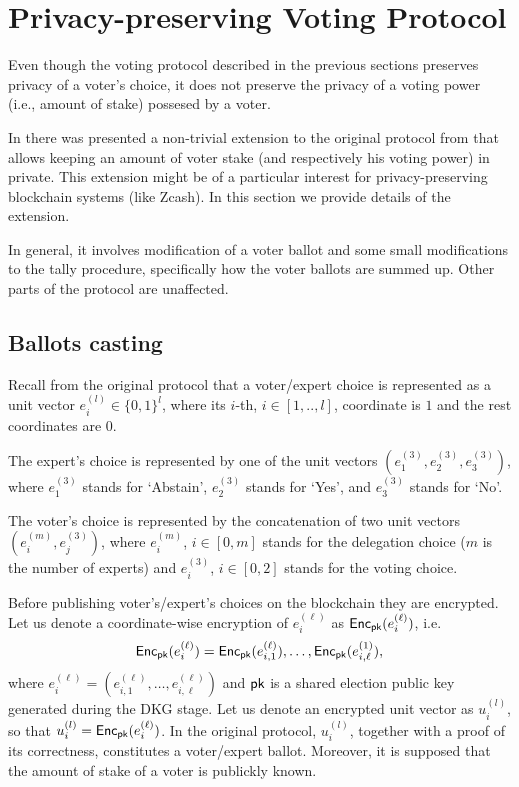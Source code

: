 \section{Privacy-preserving Voting Protocol}

Even though the voting protocol described in the previous sections preserves privacy of a voter's choice, it does not preserve the privacy of a voting power (i.e., amount of stake) possesed by a voter.

In \cite{ZBO20} there was presented a non-trivial extension to the original protocol from \cite{ZOB18} that allows keeping an amount of voter stake (and respectively his voting power) in private. This extension might be of a particular interest for privacy-preserving blockchain systems (like Zcash). In this section we provide details of the extension.

In general, it involves modification of a voter ballot and some small modifications to the tally procedure, specifically how the voter ballots are summed up. Other parts of the protocol are unaffected.

\subsection{Ballots casting}

Recall from the original protocol that a voter/expert choice is represented as a unit vector $e^{(l)}_i \in \{0,1\}^{l}$, where its $i$-th, $i \in [1,..,l]$, coordinate is $1$ and the rest coordinates are $0$.

The expert's choice  is represented by one of the unit vectors $(e^{(3)}_1, e^{(3)}_2, e^{(3)}_3)$, where $e^{(3)}_1$ stands for `Abstain', $e^{(3)}_2$ stands for `Yes', and $e^{(3)}_3$ stands for `No'.

The voter's choice is represented by the concatenation of two  unit vectors $( e^{(m)}_i , e^{(3)}_j )$, where $e^{(m)}_i$, $i\in[0,m]$ stands for the delegation choice ($m$ is the number of experts) and $e^{(3)}_i$, $i\in[0,2]$ stands for the voting choice.

Before publishing voter's/expert's choices on the blockchain they are encrypted. Let us denote a coordinate-wise encryption of $e^{(\ell)}_i$ as $\mathsf{Enc}_{\mathsf{pk}}(e^{(\ell)}_i )$, i.e. 
\[\mathsf{Enc}_{\mathsf{pk}}(e^{(\ell)}_i ) = \mathsf{Enc}_{\mathsf{pk}}(e^{(\ell)}_{i,1}), \ldots, \mathsf{Enc}_{\mathsf{pk}}(e^{(1)}_{i,\ell}),\]
where $e^{(\ell)}_i = (e^{(\ell)}_{i,1},\ldots, e^{(\ell)}_{i,\ell})$ and $\mathsf{pk}$ is a shared election public key generated during the DKG stage. Let us denote an encrypted unit vector as $u^{(l)}_i$, so that $u^{(l)}_{i}=\mathsf{Enc}_{\mathsf{pk}}(e^{(\ell)}_{i})$. In the original protocol, $u^{(l)}_i$, together with a proof of its correctness, constitutes a voter/expert ballot. Moreover, it is supposed that the amount of stake of a voter is publickly known.

